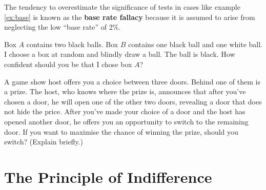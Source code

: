 The tendency to overestimate the significance of tests in cases like example
\ref{ex:base} is known as the \textbf{base rate fallacy} because it is
assumed to arise from neglecting the low ``base rate'' of 2\%.

\begin{exercise}
  Box $A$ contains two black balls. Box $B$ contains one black ball
  and one white ball. I choose a box at random and blindly draw a
  ball. The ball is black. How confident should you be that I chose
  box $A$?
\end{exercise}


\begin{exercise}\label{ex-montyhall}
  A game show host offers you a choice between three doors. Behind one
  of them is a prize. The host, who knows where the prize is,
  announces that after you've chosen a door, he will open one of the
  other two doors, revealing a door that does not hide the
  price. After you've made your choice of a door and the host has
  opened another door, he offers you an opportunity to switch to the
  remaining door. If you want to maximise the chance of winning the
  prize, should you switch? (Explain briefly.)
\end{exercise}




\section{The Principle of Indifference}

